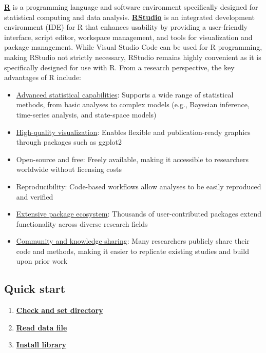 \documentclass[11pt]{article}
\begin{document}
\href{https://www.r-project.org/}{\textbf{R}} is 
a programming language and software environment specifically designed 
for statistical computing and data analysis. 
\href{https://posit.co/download/rstudio-desktop/}{\textbf{RStudio}} is 
an integrated development environment (IDE) for R 
that enhances usability by providing 
a user-friendly interface, script editor, workspace management, and tools 
for visualization and package management. 
While Visual Studio Code can be used for R programming, 
making RStudio not strictly necessary, RStudio remains highly convenient as it is specifically designed for use with R.
From a research perspective, the key advantages of R include:
\begin{itemize}
\item \uline{Advanced statistical capabilities}: Supports a wide range of statistical methods, from basic analyses to complex models (e.g., Bayesian inference, time-series analysis, and state-space models)
\item \uline{High-quality visualization}: Enables flexible and publication-ready graphics through packages such as ggplot2
\item Open-source and free: Freely available, making it accessible to researchers worldwide without licensing costs
\item Reproducibility: Code-based workflows allow analyses to be easily reproduced and verified
\item \uline{Extensive package ecosystem}: Thousands of user-contributed packages extend functionality across diverse research fields
\item \uline{Community and knowledge sharing}: Many researchers publicly share their code and methods, making it easier to replicate existing studies and build upon prior work
\end{itemize}

\subsection{Quick start}
\begin{enumerate}
\item \href{https://www.rdocumentation.org/packages/base/versions/3.6.2/topics/getwd}{\textbf{Check and set directory}}
\item \href{https://www.rdocumentation.org/packages/qtl2/versions/0.32/topics/read_csv}{\textbf{Read data file}}
\item \href{https://www.dataquest.io/blog/install-package-r/}{\textbf{Install library}}
\end{enumerate}
\end{document}
